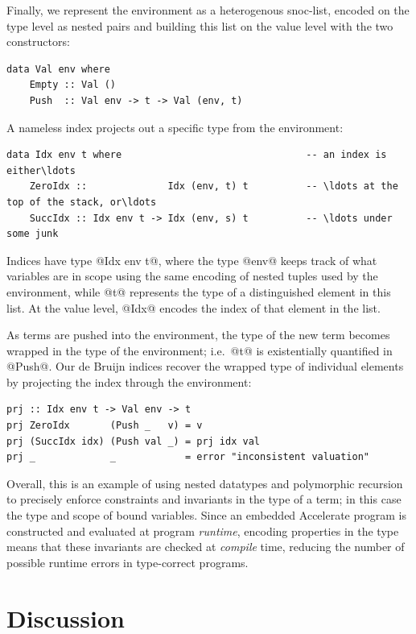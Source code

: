 Finally, we represent the environment as a heterogenous snoc-list, encoded on
the type level as nested pairs and building this list on the value level with
the two constructors:
%
\begin{lstlisting}[style=haskell]
data Val env where
    Empty :: Val ()
    Push  :: Val env -> t -> Val (env, t)
\end{lstlisting}
%
A nameless  index projects out a specific type from the
environment:
%
\begin{lstlisting}[style=haskell]
data Idx env t where                                -- an index is either\ldots
    ZeroIdx ::              Idx (env, t) t          -- \ldots at the top of the stack, or\ldots
    SuccIdx :: Idx env t -> Idx (env, s) t          -- \ldots under some junk
\end{lstlisting}
%
Indices have type @Idx env t@, where the type @env@ keeps track of what
variables are in scope using the same encoding of nested tuples used by the
environment, while @t@ represents the type of a distinguished element in this
list. At the value level, @Idx@ encodes the index of that element in the list.

As terms are pushed into the environment, the type of the new term becomes
wrapped in the type of the environment; i.e.\ @t@ is existentially quantified in
@Push@. Our de Bruijn indices recover the wrapped type of individual elements by
projecting the index through the environment:
%
\begin{lstlisting}[style=haskell]
prj :: Idx env t -> Val env -> t
prj ZeroIdx       (Push _   v) = v
prj (SuccIdx idx) (Push val _) = prj idx val
prj _             _            = error "inconsistent valuation"
\end{lstlisting}

Overall, this is an example of using nested datatypes and polymorphic recursion
to precisely enforce constraints and invariants in the type of a term; in this
case the type and scope of bound variables. Since an embedded Accelerate program is
constructed and evaluated at program \emph{runtime}, encoding properties in the
type means that these invariants are checked at \emph{compile} time, reducing
the number of possible runtime errors in type-correct programs.



\section{Discussion}



